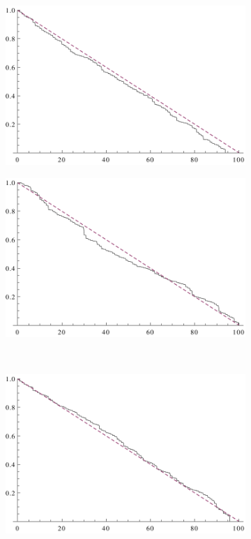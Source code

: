 \begin{figure}[ht!]
    \centering
    \begin{subfigure}[b]{0.45\textwidth}
        \centering
        \includegraphics[scale=0.5]{continuum/figures/strength_lognormal_dist/1}
    \end{subfigure}
    \begin{subfigure}[b]{0.45\textwidth}
        \centering
        \includegraphics[scale=0.5]{continuum/figures/strength_lognormal_dist/2}
    \end{subfigure}
    \\
    \begin{subfigure}[b]{0.45\textwidth}
        \centering
        \includegraphics[scale=0.5]{continuum/figures/strength_lognormal_dist/3}

\end{subfigure}
\end{figure}
